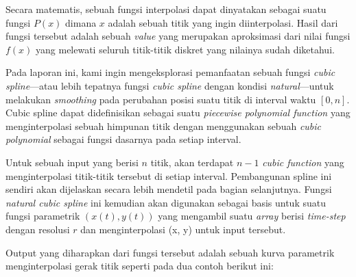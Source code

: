 \documentclass[journal,12pt,onecolumn,a4paper]{IEEEtran}
\begin{document}
Secara matematis, sebuah fungsi interpolasi dapat dinyatakan sebagai suatu fungsi \(P(x)\) dimana \(x\) adalah sebuah titik yang ingin diinterpolasi. Hasil dari fungsi tersebut adalah sebuah \emph{value} yang merupakan aproksimasi dari nilai fungsi \(f(x)\) yang melewati seluruh titik-titik diskret yang nilainya sudah diketahui.

Pada laporan ini, kami ingin mengeksplorasi pemanfaatan sebuah fungsi \emph{cubic spline}—atau lebih tepatnya fungsi \emph{cubic spline} dengan kondisi \emph{natural}—untuk melakukan \emph{smoothing} pada perubahan posisi suatu titik di interval waktu \([0, n]\). Cubic spline dapat didefinisikan sebagai suatu \emph{piecewise polynomial function} yang menginterpolasi sebuah himpunan titik dengan menggunakan sebuah \emph{cubic polynomial} sebagai fungsi dasarnya pada setiap interval.

Untuk sebuah input yang berisi \(n\) titik, akan terdapat \(n-1\) \emph{cubic function} yang menginterpolasi titik-titik tersebut di setiap interval. Pembangunan spline ini sendiri akan dijelaskan secara lebih mendetil pada bagian selanjutnya. Fungsi \emph{natural cubic spline} ini kemudian akan digunakan sebagai basis untuk suatu fungsi parametrik \((x(t), y(t))\) yang mengambil suatu \emph{array} berisi \emph{time-step} dengan resolusi \(r\) dan menginterpolasi (x, y) untuk input tersebut.

Output yang diharapkan dari fungsi tersebut adalah sebuah kurva parametrik menginterpolasi gerak titik seperti pada dua contoh berikut ini:
\end{document}
